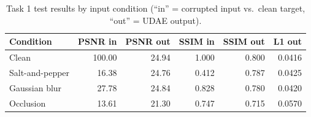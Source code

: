 \begin{table}[t]
\centering
\caption{Task 1 test results by input condition (``in'' = corrupted input vs.\ clean target, ``out'' = UDAE output).}
\label{tab:t1_type}
\footnotesize
\begin{tabular}{lrrrrr}
\toprule
Condition & PSNR in & PSNR out & SSIM in & SSIM out & L1 out \\
\midrule
Clean & 100.00 & 24.94 & 1.000 & 0.800 & 0.0416 \\
Salt-and-pepper & 16.38 & 24.76 & 0.412 & 0.787 & 0.0425 \\
Gaussian blur & 27.78 & 24.84 & 0.828 & 0.780 & 0.0420 \\
Occlusion & 13.61 & 21.30 & 0.747 & 0.715 & 0.0570 \\
\bottomrule
\end{tabular}
\end{table}

